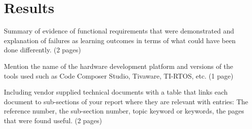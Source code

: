 \documentclass[titlepage]{article}
\begin{document}
\section{Results}
Summary of evidence of functional requirements that were demonstrated and
explanation of failures as learning outcomes in terms of what could have been done
differently. (2 pages)















\clearpage
\addappheadtotoc
\appendixpage
\appendix
Mention the name of the hardware development platform and versions of the
tools used such as Code Composer Studio, Tivaware, TI-RTOS, etc. (1 page)


\clearpage
{}
\begin{thebibliography}{9}
Including vendor supplied technical documents with a table that links each
document to sub-sections of your report where they are relevant with entries: The reference
number, the sub-section number, topic keyword or keywords, the pages that were found
useful. (2 pages)

\end{thebibliography}
\end{document}
